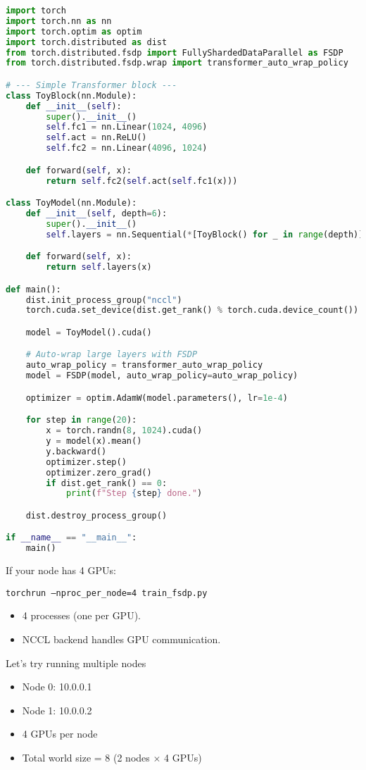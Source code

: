 \begin{lstlisting}[language=Python]
import torch
import torch.nn as nn
import torch.optim as optim
import torch.distributed as dist
from torch.distributed.fsdp import FullyShardedDataParallel as FSDP
from torch.distributed.fsdp.wrap import transformer_auto_wrap_policy

# --- Simple Transformer block ---
class ToyBlock(nn.Module):
    def __init__(self):
        super().__init__()
        self.fc1 = nn.Linear(1024, 4096)
        self.act = nn.ReLU()
        self.fc2 = nn.Linear(4096, 1024)

    def forward(self, x):
        return self.fc2(self.act(self.fc1(x)))

class ToyModel(nn.Module):
    def __init__(self, depth=6):
        super().__init__()
        self.layers = nn.Sequential(*[ToyBlock() for _ in range(depth)])

    def forward(self, x):
        return self.layers(x)

def main():
    dist.init_process_group("nccl")
    torch.cuda.set_device(dist.get_rank() % torch.cuda.device_count())

    model = ToyModel().cuda()

    # Auto-wrap large layers with FSDP
    auto_wrap_policy = transformer_auto_wrap_policy
    model = FSDP(model, auto_wrap_policy=auto_wrap_policy)

    optimizer = optim.AdamW(model.parameters(), lr=1e-4)

    for step in range(20):
        x = torch.randn(8, 1024).cuda()
        y = model(x).mean()
        y.backward()
        optimizer.step()
        optimizer.zero_grad()
        if dist.get_rank() == 0:
            print(f"Step {step} done.")

    dist.destroy_process_group()

if __name__ == "__main__":
    main()
\end{lstlisting}

If your node has 4 GPUs:

\texttt{torchrun --nproc\_per\_node=4 train\_fsdp.py}
\begin{itemize}
	\item 4 processes (one per GPU).
	\item NCCL backend handles GPU communication.
\end{itemize}

Let's try running multiple nodes

\begin{itemize}
	\item Node 0: 10.0.0.1
	\item Node 1: 10.0.0.2
	\item 4 GPUs per node
	\item Total world size = 8 (2 nodes $\times$ 4 GPUs)
\end{itemize}

